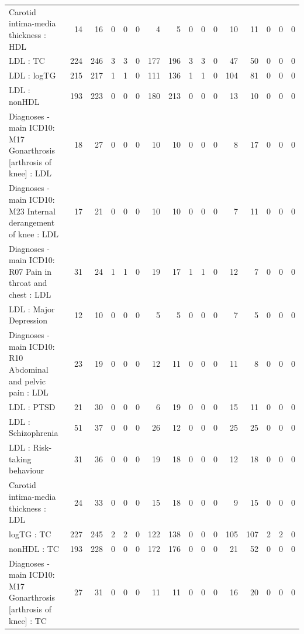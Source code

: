\begin{table}[ht]
\begin{tabular}{lrrrrrrrrrrrrrrr}
  Carotid intima-media thickness : HDL &  14 &  16 &   0 &   0 &   0 &   4 &   5 &   0 &   0 &   0 &  10 &  11 &   0 &   0 &   0 \\ 
  LDL : TC & 224 & 246 &   3 &   3 &   0 & 177 & 196 &   3 &   3 &   0 &  47 &  50 &   0 &   0 &   0 \\ 
  LDL : logTG & 215 & 217 &   1 &   1 &   0 & 111 & 136 &   1 &   1 &   0 & 104 &  81 &   0 &   0 &   0 \\ 
  LDL : nonHDL & 193 & 223 &   0 &   0 &   0 & 180 & 213 &   0 &   0 &   0 &  13 &  10 &   0 &   0 &   0 \\ 
  Diagnoses - main ICD10: M17 Gonarthrosis [arthrosis of knee] : LDL &  18 &  27 &   0 &   0 &   0 &  10 &  10 &   0 &   0 &   0 &   8 &  17 &   0 &   0 &   0 \\ 
  Diagnoses - main ICD10: M23 Internal derangement of knee : LDL &  17 &  21 &   0 &   0 &   0 &  10 &  10 &   0 &   0 &   0 &   7 &  11 &   0 &   0 &   0 \\ 
  Diagnoses - main ICD10: R07 Pain in throat and chest : LDL &  31 &  24 &   1 &   1 &   0 &  19 &  17 &   1 &   1 &   0 &  12 &   7 &   0 &   0 &   0 \\ 
  LDL : Major Depression &  12 &  10 &   0 &   0 &   0 &   5 &   5 &   0 &   0 &   0 &   7 &   5 &   0 &   0 &   0 \\ 
  Diagnoses - main ICD10: R10 Abdominal and pelvic pain : LDL &  23 &  19 &   0 &   0 &   0 &  12 &  11 &   0 &   0 &   0 &  11 &   8 &   0 &   0 &   0 \\ 
  LDL : PTSD &  21 &  30 &   0 &   0 &   0 &   6 &  19 &   0 &   0 &   0 &  15 &  11 &   0 &   0 &   0 \\ 
  LDL : Schizophrenia &  51 &  37 &   0 &   0 &   0 &  26 &  12 &   0 &   0 &   0 &  25 &  25 &   0 &   0 &   0 \\ 
  LDL : Risk-taking behaviour &  31 &  36 &   0 &   0 &   0 &  19 &  18 &   0 &   0 &   0 &  12 &  18 &   0 &   0 &   0 \\ 
  Carotid intima-media thickness : LDL &  24 &  33 &   0 &   0 &   0 &  15 &  18 &   0 &   0 &   0 &   9 &  15 &   0 &   0 &   0 \\ 
  logTG : TC & 227 & 245 &   2 &   2 &   0 & 122 & 138 &   0 &   0 &   0 & 105 & 107 &   2 &   2 &   0 \\ 
  nonHDL : TC & 193 & 228 &   0 &   0 &   0 & 172 & 176 &   0 &   0 &   0 &  21 &  52 &   0 &   0 &   0 \\ 
  Diagnoses - main ICD10: M17 Gonarthrosis [arthrosis of knee] : TC &  27 &  31 &   0 &   0 &   0 &  11 &  11 &   0 &   0 &   0 &  16 &  20 &   0 &   0 &   0 \\ 

\end{tabular}
\end{table}
